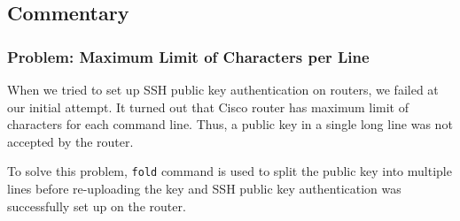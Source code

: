 \subsection{Commentary}

\subsubsection{Problem: Maximum Limit of Characters per Line}

When we tried to set up SSH public key authentication on routers, we failed at our initial attempt. It turned out that Cisco router has maximum limit of characters for each command line. Thus, a public key in a single long line was not accepted by the router. 

To solve this problem, \texttt{fold} command is used to split the public key into multiple lines before re-uploading the key and SSH public key authentication was successfully set up on the router.
